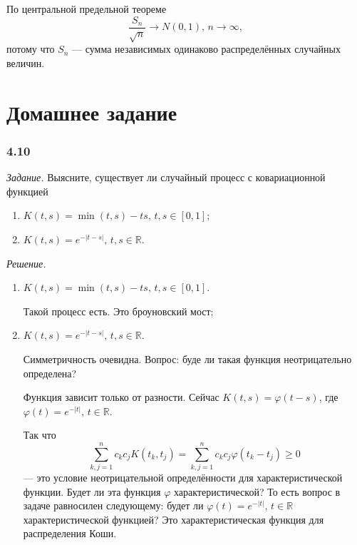 По центральной предельной теореме
$$ \frac{S_n}{ \sqrt{n}} \to N \left( 0, 1 \right), \,
  n \to \infty,$$
потому что $S_n$ --- сумма независимых одинаково распределённых случайных величин.

\section*{Домашнее задание}

\subsubsection*{4.10}

\textit{Задание.}
Выясните, существует ли случайный процесс с ковариационной функцией
\begin{enumerate}[label=\alph*)]
  \item $K \left( t, s \right) = \min \left( t, s \right) - ts, \, t, s \in \left[ 0, 1 \right] $;
  \item $K \left( t, s \right) = e^{- \left| t - s \right| }, \, t, s \in \mathbb{R}$.
\end{enumerate}

\textit{Решение.}
\begin{enumerate}[label=\alph*)]
  \item $K \left( t, s \right) = \min \left( t, s \right) - ts, \, t, s \in \left[ 0, 1 \right] $.

  Такой процесс есть.
  Это броуновский мост;
  \item $K \left( t, s \right) = e^{- \left| t - s \right| }, \, t, s \in \mathbb{R}$.

  Симметричность очевидна.
  Вопрос: буде ли такая функция неотрицательно определена?

  Функция зависит только от разности.
  Сейчас $K \left( t, s \right) = \varphi \left( t - s \right) $,
  где $ \varphi \left( t \right) = e^{-\left| t \right| }, \, t \in \mathbb{R}$.

  Так что
  $$ \sum \limits_{k, j = 1}^n c_k c_j K \left( t_k, t_j \right) =
    \sum \limits_{k, j = 1}^n c_k c_j \varphi \left( t_k - t_j \right) \geq
    0$$
  --- это условие неотрицательной определённости для характеристической функции.
  Будет ли эта функция $ \varphi $ характеристической?
  То есть вопрос в задаче равносилен следующему:
  будет ли $ \varphi \left( t \right) = e^{-\left| t \right| }, \, t \in \mathbb{R}$
  характеристической функцией?
  Это характеристическая функция для распределения Коши.
\end{enumerate}

